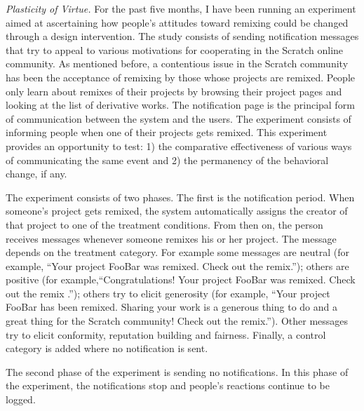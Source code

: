 
\emph{Plasticity of Virtue.}
For the past five months, I have been running an experiment aimed at ascertaining how people's attitudes toward remixing could be changed through a design intervention.
The study consists of sending notification messages that try to appeal to various motivations for cooperating in the Scratch online community. 
As mentioned before, a contentious issue in the Scratch community has been the acceptance of remixing by those whose projects are remixed. 
People only learn about remixes of their projects by browsing their project pages and looking at the list of derivative works. 
The notification page is the principal form of communication between the system and the users.
The experiment consists of informing people when one of their projects gets remixed.
This experiment provides an opportunity to test: 1) the comparative effectiveness of various ways of communicating the same event and 2) the permanency of the behavioral change, if any. 

The experiment consists of two phases.
The first is the notification period. 
When someone's project gets remixed, the system automatically assigns the creator of that project to one of the treatment conditions. 
From then on, the person receives messages whenever someone remixes his or her project. The message depends on the treatment category.
For example some messages are neutral (for example, ``Your project FooBar was remixed. Check out the remix.''); 
others are positive (for example,``Congratulations! Your project FooBar was remixed. Check out the remix .'');
others try to elicit generosity (for example, ``Your project FooBar has been remixed. Sharing your work is a generous thing to do and a great thing for the Scratch community! Check out the remix.'').
Other messages try to elicit conformity, reputation building and fairness.
Finally, a control category is added where no notification is sent.

The second phase of the experiment is sending no notifications. In this phase of the experiment, the notifications stop and people's reactions continue to be logged.

